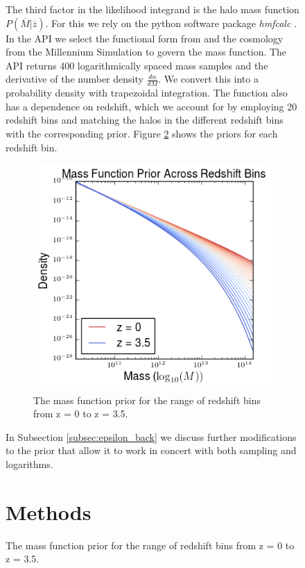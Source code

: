 \documentclass[\docopts]{\docclass}
\begin{document}
\begin{figure}[h!]
The third factor in the likelihood integrand is the halo mass function $P(\overline{M}|\overline{z})$. 
For this we rely on the python software package \emph{hmfcalc} \citep*{hmf}. 
In the API we select the functional form from \citep{tinker} and the cosmology from the Millennium Simulation to govern the mass function. 
The API returns 400 logarithmically spaced mass samples and the derivative of the number density $\frac{dn}{dM}$. 
We convert this into a probability density with trapezoidal integration.
The function also has a dependence on redshift, which we account for by employing 20 redshift bins and matching the halos in the different redshift bins with the corresponding prior.
Figure \ref{fig:priors} shows the priors for each redshift bin.

\begin{figure}[h]
\centering
\includegraphics[width=1.0\columnwidth]{priors.png}
\caption{
The mass function prior for the range of redshift bins from z = 0 to z = 3.5.
\label{fig:priors}}
\end{figure}

In Subsection \ref{subsec:epsilon_back} we discuss further modifications to the prior that allow it to work in concert with both sampling and logarithms. 



\section{Methods}
\label{sec:methods}


\end{figure}
\end{document}
